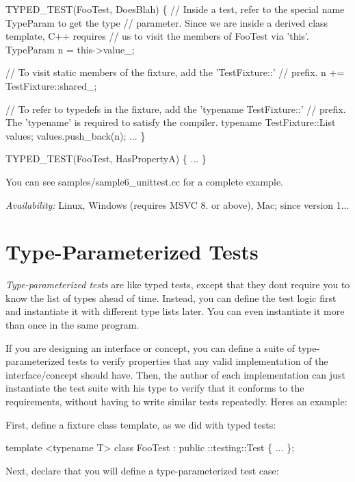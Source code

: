 \begin{DoxyCode}
TYPED\_TEST(FooTest, DoesBlah) \{
  // Inside a test, refer to the special name TypeParam to get the type
  // parameter.  Since we are inside a derived class template, C++ requires
  // us to visit the members of FooTest via 'this'.
  TypeParam n = this->value\_;

  // To visit static members of the fixture, add the 'TestFixture::'
  // prefix.
  n += TestFixture::shared\_;

  // To refer to typedefs in the fixture, add the 'typename TestFixture::'
  // prefix.  The 'typename' is required to satisfy the compiler.
  typename TestFixture::List values;
  values.push\_back(n);
  ...
\}

TYPED\_TEST(FooTest, HasPropertyA) \{ ... \}
\end{DoxyCode}


You can see {\ttfamily samples/sample6\+\_\+unittest.\+cc} for a complete example.

{\itshape Availability\+:} Linux, Windows (requires M\+S\+VC 8. or above), Mac; since version 1...

\section*{Type-\/\+Parameterized Tests}

{\itshape Type-\/parameterized tests} are like typed tests, except that they don\textquotesingle{}t require you to know the list of types ahead of time. Instead, you can define the test logic first and instantiate it with different type lists later. You can even instantiate it more than once in the same program.

If you are designing an interface or concept, you can define a suite of type-\/parameterized tests to verify properties that any valid implementation of the interface/concept should have. Then, the author of each implementation can just instantiate the test suite with his type to verify that it conforms to the requirements, without having to write similar tests repeatedly. Here\textquotesingle{}s an example\+:

First, define a fixture class template, as we did with typed tests\+:


\begin{DoxyCode}
template <typename T>
class FooTest : public ::testing::Test \{
  ...
\};
\end{DoxyCode}


Next, declare that you will define a type-\/parameterized test case\+:


